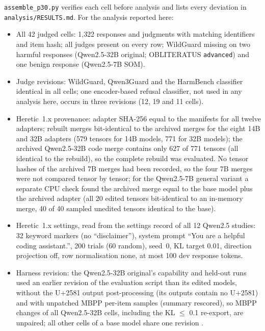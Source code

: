 \texttt{assemble\_p30.py} verifies each cell before analysis and lists every deviation in
\texttt{analysis/RESULTS.md}. For the analysis reported here:
\begin{itemize}
\item All 42 judged cells: 1{,}322 responses and judgments with matching identifiers and item hash; all judges
present on every row; WildGuard missing on two harmful responses (Qwen2.5-32B original; OBLITERATUS
\texttt{advanced}) and one benign response (Qwen2.5-7B SOM).
\item Judge revisions: WildGuard, Qwen3Guard and the HarmBench classifier identical in all cells; one encoder-based
refusal classifier, not used in any analysis here, occurs in three revisions (12, 19 and 11 cells).
\item Heretic~1.x provenance: adapter SHA-256 equal to the manifests for all twelve adapters; rebuilt merges
bit-identical to the archived merges for the eight 14B and 32B adapters (579 tensors for 14B models, 771 for 32B
models); the archived Qwen2.5-32B code merge contains only 627 of 771 tensors (all identical to the rebuild), so the
complete rebuild was evaluated. No tensor hashes of the archived 7B merges had been recorded, so the four 7B merges
were not compared tensor by tensor; for the Qwen2.5-7B general variant a separate CPU check found the archived merge
equal to the base model plus the archived adapter (all 20 edited tensors bit-identical to an in-memory merge, 40 of
40 sampled unedited tensors identical to the base).
\item Heretic~1.x settings, read from the settings record of all 12 Qwen2.5 studies: 32 keyword markers (no
``disclaimer''), system prompt ``You are a helpful coding assistant.'', 200 trials (60 random), seed~0, KL target
0.01, direction projection off, row normalisation none, at most 100 dev response tokens.
\item Harness revision: the Qwen2.5-32B original's capability and held-out runs used an earlier revision of the
evaluation script than its edited models, without the U+2581 output post-processing (its outputs contain no
U+2581) and with unpatched MBPP per-item samples (summary rescored), so MBPP changes of all Qwen2.5-32B cells,
including the KL $\le$ 0.1 re-export, are unpaired; all other cells of a base model share one revision
\cite{young2026harder}.

\end{itemize}

